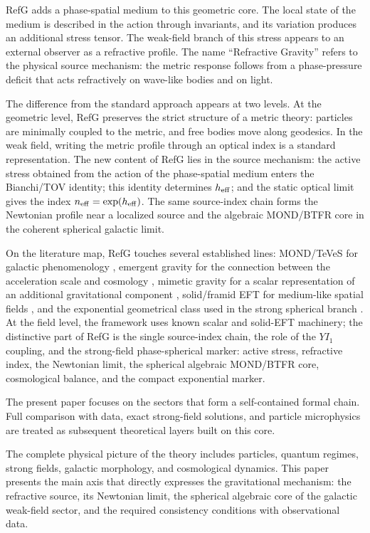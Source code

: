 \documentclass[12pt]{article}
\begin{document}
RefG adds a phase-spatial medium to this geometric core. The local state of the medium is described in the action through invariants, and its variation produces an additional stress tensor. The weak-field branch of this stress appears to an external observer as a refractive profile. The name ``Refractive Gravity'' refers to the physical source mechanism: the metric response follows from a phase-pressure deficit that acts refractively on wave-like bodies and on light.

The difference from the standard approach appears at two levels. At the geometric level, RefG preserves the strict structure of a metric theory: particles are minimally coupled to the metric, and free bodies move along geodesics. In the weak field, writing the metric profile through an optical index is a standard representation. The new content of RefG lies in the source mechanism: the active stress obtained from the action of the phase-spatial medium enters the Bianchi/TOV identity; this identity determines $h_{\rm eff}$; and the static optical limit gives the index $n_{\rm eff}=\exp(h_{\rm eff})$. The same source-index chain forms the Newtonian profile near a localized source and the algebraic MOND/BTFR core in the coherent spherical galactic limit.

On the literature map, RefG touches several established lines: MOND/TeVeS for galactic phenomenology \cite{Milgrom1983,Bekenstein2004}, emergent gravity for the connection between the acceleration scale and cosmology \cite{Verlinde2017}, mimetic gravity for a scalar representation of an additional gravitational component \cite{ChamseddineMukhanov2013}, solid/framid EFT for medium-like spatial fields \cite{Endlich2013,Nicolis2015}, and the exponential geometrical class used in the strong spherical branch \cite{Boonserm2018}. At the field level, the framework uses known scalar and solid-EFT machinery; the distinctive part of RefG is the single source-index chain, the role of the $YI_1$ coupling, and the strong-field phase-spherical marker: active stress, refractive index, the Newtonian limit, the spherical algebraic MOND/BTFR core, cosmological balance, and the compact exponential marker.

The present paper focuses on the sectors that form a self-contained formal chain. Full comparison with data, exact strong-field solutions, and particle microphysics are treated as subsequent theoretical layers built on this core.

The complete physical picture of the theory includes particles, quantum regimes, strong fields, galactic morphology, and cosmological dynamics. This paper presents the main axis that directly expresses the gravitational mechanism: the refractive source, its Newtonian limit, the spherical algebraic core of the galactic weak-field sector, and the required consistency conditions with observational data.
\end{document}
